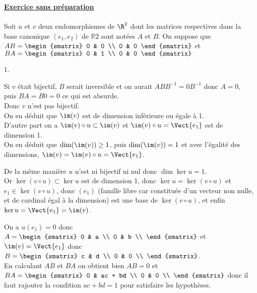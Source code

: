 \documentclass[11pt]{article}%
\begin{document}
\begin{exercice}
 

 \noindent \textbf{\underline{Exercice sans préparation}} \\
\\
 Soit $u$ et $v$ deux endomorphismes de $\R^{2}$ dont les matrices
 respectives dans la base canonique $\left( e_{1},e_{2}\right) $ de
$\mathbb{R }{2}$ sont notées $A$ et $B$. On suppose que $AB =
\begin{smatrix}
 0 & 0 \\
 0 & 0
\end{smatrix}
$ et $BA = \begin{smatrix}
 0 & 1 \\
 0 & 0
\end{smatrix}
$

 \begin{noliste}{1.}
 \setlength{\itemsep}{4mm}
 \item Si $v$ était bijectif, $B$ serait inversible et on aurait $A B
B^{-1} = 0 B^{-1}$ donc $A = 0$, puis $B A = B 0 = 0$ ce qui est
absurde. \\
 Donc $v$ n'est pas bijectif. \\
 On en déduit que $\im(v)$ est de dimension inférieure ou égale à 1. \\
 D'autre part on a $\im(v) \circ u \subset \im(v)$ et $\im(v) \circ u =
\Vect{ e_{1}}$ est de dimension 1. \\
 On en déduit que $\dim (\im(v)) \geq 1$, puis $\dim (\im(v)) = 1$ et avec
l'égalité des dimensions, $\im(v) = \im(v) \circ u = \Vect{ e_{1}}$. \\

 \item De la même manière $u$ n'est ni bijectif ni nul donc $\dim \ker
u = 1$. \\
 Or $\ker (v \circ u) \subset \ker u$ est de dimension 1, donc $\ker u
= \ker (v \circ u)$ et $e_{1} \in \ker (v \circ u)$, donc $(e_{1})$
(famille libre car constituée d'un vecteur non nulle, et de cardinal
égal à la dimension) est une base de $\ker (v \circ u)$, et enfin $\ker
u = \Vect{ e_{1}} = \im(v)$. \\


 \item On a $u(e_{1}) = 0$ donc $A = \begin{smatrix}
0 & a \\
0 & b \\
\end{smatrix}
$ et $\im(v) = \Vect{ e_{1}}$ donc $B =
\begin{smatrix}
c & d \\
0 & 0 \\
\end{smatrix}
$. \\
 En calculant $AB$ et $BA$ on obtient bien $AB = 0$ et $BA =
\begin{smatrix}
0 & ac + bd \\
0 & 0 \\
\end{smatrix}
$ donc il faut rajouter la condition $ac + bd = 1$ pour satisfaire les
hypothèses.
 \end{noliste}
 \end{exercice}
\end{document}
